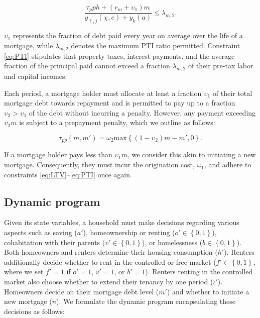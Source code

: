 \documentclass[parskip=full]{article}
\begin{document}
\begin{equation}\label{eq:PTI}
\frac{\tau_{p}ph+(r_{m}+\upsilon_{1})m}{y_{\ell,j}(\chi,e)+y_{k}(a)} \leq \lambda_{m,2}.
\end{equation}

\noindent $\upsilon_{1}$ represents the fraction of debt paid every year on average over the life of a mortgage, while $\lambda_{m,2}$ denotes the maximum PTI ratio permitted. Constraint \eqref{eq:PTI} stipulates that property taxes, interest payments, and the average fraction of the principal paid cannot exceed a fraction $\lambda_{m,2}$ of their pre-tax labor and capital incomes.

Each period, a mortgage holder must allocate at least a fraction $\upsilon_{1}$ of their total mortgage debt towards repayment and is permitted to pay up to a fraction $\upsilon_{2}>\upsilon_{1}$ of the debt without incurring a penalty. However, any payment exceeding $\upsilon_{2}m$ is subject to a prepayment penalty, which we outline as follows:

\begin{equation}\label{eq:prepayment_penalty}
\tau_{pp}(m,m')=\omega_{2}\mbox{max}\left\{(1-\upsilon_{2})m-m',0\right\}.
\end{equation}

\noindent If a mortgage holder pays less than $\upsilon_{1}m$, we consider this akin to initiating a new mortgage. Consequently, they must incur the origination cost, $\omega_{1}$, and adhere to constraints \eqref{eq:LTV}--\eqref{eq:PTI} once again.

\subsection{Dynamic program}\label{subsection:household_optimization}
Given its state variables, a household must make decisions regarding various aspects such as saving ($a'$), homeownership or renting ($o' \in \left\{0,1\right\}$), cohabitation with their parents ($v' \in \left\{0,1\right\}$), or homelessness ($b \in \left\{0,1\right\}$). Both homeowners and renters determine their housing consumption ($h'$). Renters additionally decide whether to rent in the controlled or free market ($f' \in \left\{0,1\right\}$, where we set $f'=1$ if $o'=1$, $v'=1$, or $b'=1$). Renters renting in the controlled market also choose whether to extend their tenancy by one period ($\iota'$). Homeowners decide on their mortgage debt level ($m'$) and whether to initiate a new mortgage ($n$). We formulate the dynamic program encapsulating these decisions as follows:
\end{document}
